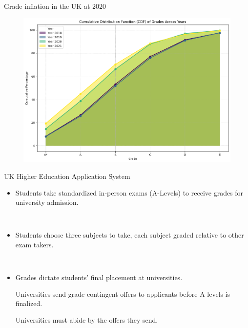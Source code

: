 \begin{frame}{Grade inflation in the UK at 2020}
\begin{figure}
    \centering
    \includegraphics[width=\textwidth]{Figures/GradeDistribution.png}
    \label{fig:enter-label}
\end{figure}
\end{frame}

\begin{frame}{UK Higher Education Application System}
    \begin{itemize}
        \item Students take standardized in-person exams (A-Levels) to receive grades for university admission.

        \
        
        \item Students choose three subjects to take, each subject graded relative to other exam takers. 

        \

        \item Grades dictate students' final placement at universities.
        
        Universities send grade contingent offers to applicants before A-levels is finalized.

        Universities must abide by the offers they send.
        \end{itemize}
\end{frame}

